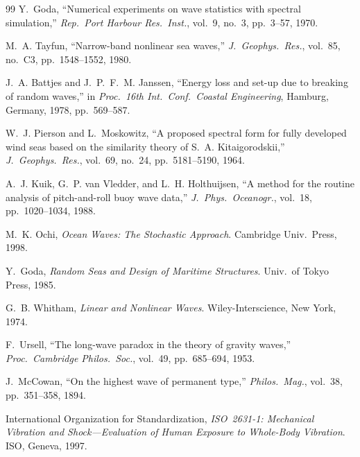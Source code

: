 \documentclass[journal]{IEEEtran}
\begin{document}
\begin{thebibliography}{99}
        Y.~Goda,
        ``Numerical experiments on wave statistics with spectral simulation,''
        \emph{Rep.\ Port Harbour Res.\ Inst.}, vol.~9, no.~3,
        pp.~3--57, 1970.

        M.~A. Tayfun,
        ``Narrow-band nonlinear sea waves,''
        \emph{J.\ Geophys.\ Res.}, vol.~85, no.~C3,
        pp.~1548--1552, 1980.

        J.~A. Battjes and J.~P.~F.~M. Janssen,
        ``Energy loss and set-up due to breaking of random waves,''
        in \emph{Proc.\ 16th Int.\ Conf.\ Coastal Engineering},
        Hamburg, Germany, 1978, pp.~569--587.

        W.~J. Pierson and L.~Moskowitz,
        ``A proposed spectral form for fully developed wind seas based on
        the similarity theory of S.~A. Kitaigorodskii,''
        \emph{J.\ Geophys.\ Res.}, vol.~69, no.~24,
        pp.~5181--5190, 1964.

        A.~J. Kuik, G.~P. van Vledder, and L.~H. Holthuijsen,
        ``A method for the routine analysis of pitch-and-roll buoy wave data,''
        \emph{J.\ Phys.\ Oceanogr.}, vol.~18, pp.~1020--1034, 1988.

        M.~K. Ochi,
        \emph{Ocean Waves: The Stochastic Approach}.
        Cambridge Univ.\ Press, 1998.

        Y.~Goda,
        \emph{Random Seas and Design of Maritime Structures}.
        Univ.\ of Tokyo Press, 1985.

        G.~B. Whitham,
        \emph{Linear and Nonlinear Waves}.
        Wiley-Interscience, New York, 1974.

        F.~Ursell,
        ``The long-wave paradox in the theory of gravity waves,''
        \emph{Proc.\ Cambridge Philos.\ Soc.}, vol.~49, pp.~685--694, 1953.

        J.~McCowan,
        ``On the highest wave of permanent type,''
        \emph{Philos.\ Mag.}, vol.~38, pp.~351--358, 1894.

        International Organization for Standardization,
        \emph{ISO~2631-1: Mechanical Vibration and Shock---Evaluation of Human
        Exposure to Whole-Body Vibration}.
        ISO, Geneva, 1997.


\end{thebibliography}
\end{document}

